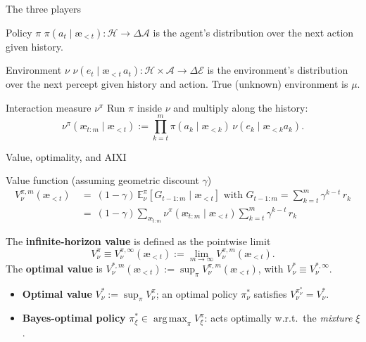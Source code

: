 \documentclass[10pt,aspectratio=169]{beamer}
\newcommand{\cA}{\mathcal{A}}
\newcommand{\cE}{\mathcal{E}}
\newcommand{\cH}{\mathcal{H}}
\newcommand{\Ex}{\mathbb{E}}
\DeclareMathOperator*{\argmax}{arg\,max}
\newcommand{\aes}{{\text{\ae}}}            %
\begin{document}
\begin{frame}{The three players}
\begin{block}{Policy $\pi$}
$\pi(a_t \mid \aes_{<t}) : \cH \to \Delta \cA$  is the agent's distribution over the next action given history.
\end{block}
\pause
\begin{block}{Environment $\nu$}
$\nu(e_t \mid \aes_{<t}\, a_t) : \cH \times \cA \to \Delta \cE$ is the environment's distribution over the next percept given history and action. 
True (unknown) environment is $\mu$.
\end{block}
\pause
\begin{block}{Interaction measure $\nu^\pi$}
Run $\pi$ inside $\nu$ and multiply along the history:
\[
\nu^\pi(\aes_{t:m} \mid \aes_{<t}) := \prod_{k=t}^m \pi(a_k\mid \aes_{<k})\,\nu(e_k\mid \aes_{<k}a_k).
\]
\end{block}
\end{frame}

\begin{frame}{Value, optimality, and AIXI}
\begin{block}{Value function (assuming geometric discount $\gamma$)}
\vspace{-0.3cm}
\begin{align*}
V_\nu^{\pi,m}(\aes_{<t})
~&=~ (1-\gamma)\, {\Ex_\nu^\pi} [G_{t-1:m} \mid \aes_{<t}] \text{ with } G_{t-1:m} = \sum_{k=t}^{m} \gamma^{k-t}\, r_k \\
~&=~ (1-\gamma) \sum_{\aes_{t:m}} \nu^\pi(\aes_{t:m} \mid \aes_{<t}) \sum_{k=t}^{m} \gamma^{k-t}\, r_k 
\end{align*}
\end{block}
\pause
The \textbf{infinite-horizon value} is defined as the pointwise limit 
$$
V_\nu^\pi \equiv  V_\nu^{\pi,\infty}(\aes_{<t}) := \lim_{m \to \infty} V_\nu^{\pi,m}(\aes_{<t}).
$$
\pause
The \textbf{optimal value} is $V_\nu^{*,m}(\aes_{<t}) := \sup_\pi V_\nu^{\pi,m}(\aes_{<t})$, with $V_\nu^* \equiv V_\nu^{*,\infty}$.%
\pause
\begin{itemize}
    \item \textbf{Optimal value} $V_\nu^* := \sup_\pi V_\nu^\pi$; an optimal policy $\pi_\nu^*$ satisfies $V_\nu^{\pi_\nu^*} = V_\nu^*$.
    \item \textbf{Bayes-optimal policy} $\pi_\xi^* \in \argmax_\pi V_\xi^\pi$: acts optimally w.r.t.\ the \emph{mixture} $\xi$.
\end{itemize}
\end{frame}
\end{document}
